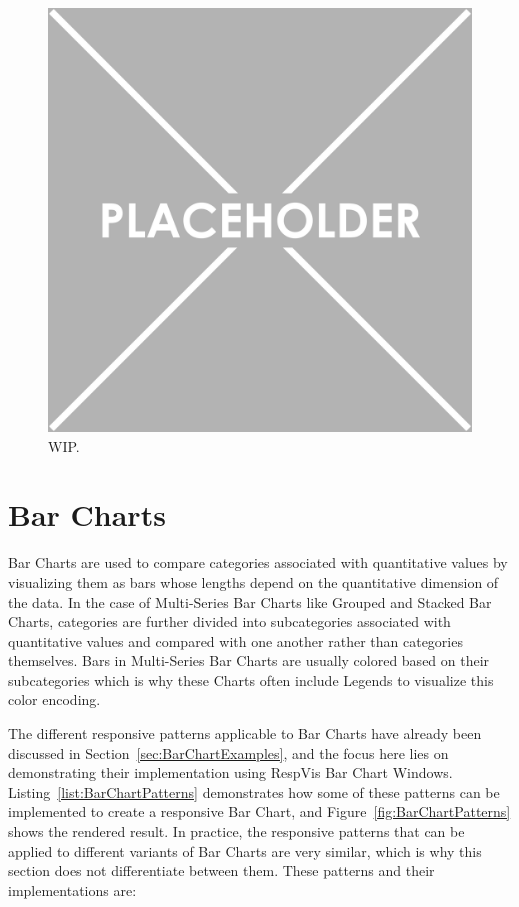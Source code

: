 \begin{figure}[tp]
\centering
\includegraphics[keepaspectratio,width=\linewidth,height=\fullh]{images/placeholder.png}
\caption[Results of Legend-Related Responsive Patterns]{
  WIP.
}
\label{fig:LegendPatterns}
\end{figure}

\section{Bar Charts}
\label{sec:BarChartsUsage}

Bar Charts are used to compare categories associated with quantitative values by visualizing them as bars whose lengths depend on the quantitative dimension of the data.
In the case of Multi-Series Bar Charts like Grouped and Stacked Bar Charts, categories are further divided into subcategories associated with quantitative values and compared with one another rather than categories themselves.
Bars in Multi-Series Bar Charts are usually colored based on their subcategories which is why these Charts often include Legends to visualize this color encoding.

The different responsive patterns applicable to Bar Charts have already been discussed in Section~\ref{sec:BarChartExamples}, and the focus here lies on demonstrating their implementation using RespVis Bar Chart Windows.
Listing~\ref{list:BarChartPatterns} demonstrates how some of these patterns can be implemented to create a responsive Bar Chart, and Figure~\ref{fig:BarChartPatterns} shows the rendered result.
In practice, the responsive patterns that can be applied to different variants of Bar Charts are very similar, which is why this section does not differentiate between them.
These patterns and their implementations are:

